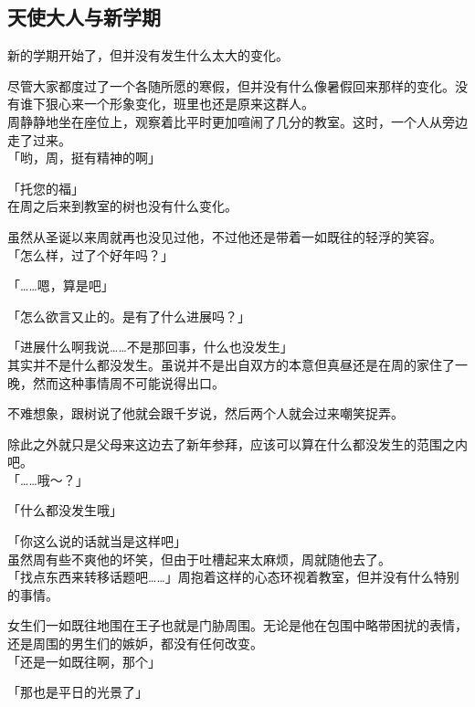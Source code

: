 \subsection{天使大人与新学期}

新的学期开始了，但并没有发生什么太大的变化。

尽管大家都度过了一个各随所愿的寒假，但并没有什么像暑假回来那样的变化。没有谁下狠心来一个形象变化，班里也还是原来这群人。\\

周静静地坐在座位上，观察着比平时更加喧闹了几分的教室。这时，一个人从旁边走了过来。\\

「哟，周，挺有精神的啊」

「托您的福」\\

在周之后来到教室的树也没有什么变化。

虽然从圣诞以来周就再也没见过他，不过他还是带着一如既往的轻浮的笑容。\\

「怎么样，过了个好年吗？」

「……嗯，算是吧」

「怎么欲言又止的。是有了什么进展吗？」

「进展什么啊我说……不是那回事，什么也没发生」\\

其实并不是什么都没发生。虽说并不是出自双方的本意但真昼还是在周的家住了一晚，然而这种事情周不可能说得出口。

不难想象，跟树说了他就会跟千岁说，然后两个人就会过来嘲笑捉弄。

除此之外就只是父母来这边去了新年参拜，应该可以算在什么都没发生的范围之内吧。\\

「……哦～？」

「什么都没发生哦」

「你这么说的话就当是这样吧」\\

虽然周有些不爽他的坏笑，但由于吐槽起来太麻烦，周就随他去了。\\

「找点东西来转移话题吧……」周抱着这样的心态环视着教室，但并没有什么特别的事情。

女生们一如既往地围在王子也就是门胁周围。无论是他在包围中略带困扰的表情，还是周围的男生们的嫉妒，都没有任何改变。\\

「还是一如既往啊，那个」

「那也是平日的光景了」\\

